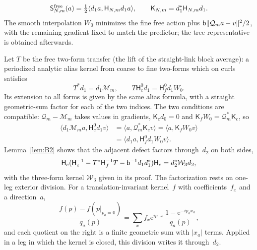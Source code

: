 \begin{equation*}
\mathsf S^{\rm free}_{N,m}(a)=\tfrac12\langle d_1a,\mathsf H_{N,m}d_1a\rangle,\qquad
\mathsf K_{N,m}=d_1^*\mathsf H_{N,m}d_1.
\end{equation*}
The smooth interpolation $W_0$ minimizes the fine free action plus $\mathsf{b}\|\mathcal Q_ma-v\|^2/2$, with the remaining gradient fixed to match the predictor; the tree representative is obtained afterwards.

Let $T$ be the free two-form transfer (the lift of the straight-link block average): a periodized analytic alias kernel from coarse to fine two-forms which on curls satisfies
\begin{equation*}
T^*d_1=d_1\mathcal M_m,\qquad T\mathsf H_c^0d_1=\mathsf H_f^0d_1W_0.
\end{equation*}
Its extension to all forms is given by the same alias formula, with a straight geometric-sum factor for each of the two indices. The two conditions are compatible: $\mathcal Q_m-\mathcal M_m$ takes values in gradients, $\mathsf K_cd_0=0$ and $\mathsf K_fW_0=\mathcal Q_m^*\mathsf K_c$, so
\begin{align*}
\langle d_1\mathcal M_ma,\mathsf H_c^0d_1v\rangle
&=\langle a,\mathcal Q_m^*\mathsf K_cv\rangle
=\langle a,\mathsf K_fW_0v\rangle\\
&=\langle d_1a,\mathsf H_f^0d_1W_0v\rangle.
\end{align*}
Lemma~\ref{lem:B2} shows that the adjacent defect factors through~$d_2$ on both sides,
\begin{equation}\label{eq:B-free-defect}
\mathsf H_c(\mathsf H_c^{-1}-T^*\mathsf H_f^{-1}T
 -\mathsf{b}^{-1}d_1d_1^*)\mathsf H_c=d_2^*\mathcal W_3d_2,
\end{equation}
with the three-form kernel $\mathcal W_3$ given in its proof. The factorization rests on one-leg exterior division. For a translation-invariant kernel~$f$ with coefficients~$f_x$ and a direction~$a$,
\begin{equation}\label{eq:B-exterior-division}
\frac{f(p)-f(p|_{p_a=0})}{q_a(p)}=\sum_x f_x \mathrm e^{ip\cdot x}\,\frac{1-\mathrm e^{-ip_ax_a}}{q_a(p)},
\end{equation}
and each quotient on the right is a finite geometric sum with $|x_a|$ terms. Applied in a leg in which the kernel is closed, this division writes it through~$d_2$.

